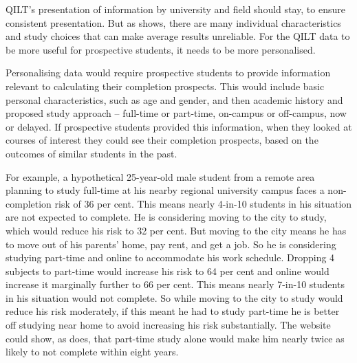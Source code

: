 QILT's presentation of information by university and field should stay, to ensure consistent presentation. But as  shows, there are many individual characteristics and study choices that can make average results unreliable. For the QILT data to be more useful for prospective students, it needs to be more personalised.

Personalising data would require prospective students to provide information relevant to calculating their completion prospects. This would include basic personal characteristics, such as age and gender, and then academic history and proposed study approach -- full-time or part-time, on-campus or off-campus, now or delayed. If prospective students provided this information, when they looked at courses of interest they could see their completion prospects, based on the outcomes of similar students in the past.

\vspace{6cm} %
\pagebreak

For example, a hypothetical 25-year-old male student from a remote area planning to study full-time at his nearby regional university campus faces a non-completion risk of 36 per cent. This means nearly 4-in-10 students in his situation are not expected to complete. He is considering moving to the city to study, which would reduce his risk to 32 per cent. But moving to the city means he has to move out of his parents' home, pay rent, and get a job. So he is considering studying part-time and online to accommodate his work schedule. Dropping 4 subjects to part-time would increase his risk to 64 per cent and online would increase it marginally further to 66 per cent. This means nearly 7-in-10 students in his situation would not complete. So while moving to the city to study would reduce his risk moderately, if this meant he had to study part-time he is better off studying near home to avoid increasing his risk substantially. The website could show, as  does, that part-time study alone would make him nearly twice as likely to not complete within eight years. 

